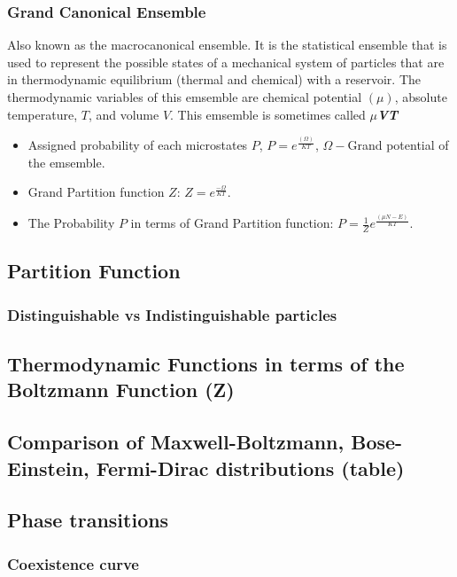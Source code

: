 \documentclass[]{article}
\begin{document}
\subsubsection{Grand Canonical Ensemble}
Also known as the macrocanonical ensemble. It is the statistical ensemble that is used to represent the possible states of a mechanical system of particles that are in thermodynamic equilibrium (thermal and chemical) with a reservoir. The thermodynamic variables of this emsemble are chemical potential $(\mu)$, absolute temperature, $T$, and volume $V$. This emsemble is sometimes called \textbf{\textit{$\mu$VT}}


\begin{itemize}
    \item Assigned probability of each microstates $P$, $P= e^{\frac{(\Omega )}{KT}}$, $\Omega-$Grand potential of the emsemble.
      \item  Grand Partition function $Z$: $Z= e^{\frac{-\Omega }{KT}}$.
    \item The Probability $P$ in terms of  Grand Partition function: $P= \frac{1}{Z}e^{\frac{(\mu N-E)}{KT}}$.
    
\end{itemize}

\subsection{Partition Function}


\subsubsection{Distinguishable vs Indistinguishable particles}

\subsection{Thermodynamic Functions in terms of the Boltzmann Function (Z)}

\subsection{Comparison of Maxwell-Boltzmann, Bose-Einstein, Fermi-Dirac distributions (table)}

\subsection{Phase transitions}
\subsubsection{Coexistence curve}
\end{document}
